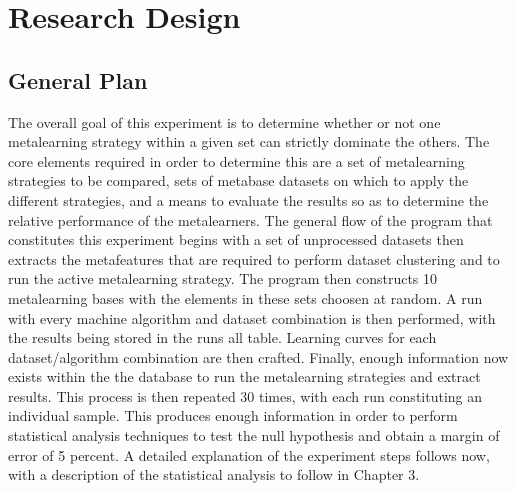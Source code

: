\chapter{Research Design}
\label{Chapter3}
\section{General Plan}
The overall goal of this experiment is to determine whether or not one
metalearning strategy within a given set can strictly dominate the others. The
core elements required in order to determine this are a set of metalearning
strategies to be compared, sets of metabase datasets on which to apply the
different strategies, and a means to evaluate the results so as to determine the
relative performance of the metalearners. The general flow of the program that
constitutes this experiment begins with a set of unprocessed datasets then
extracts the metafeatures that are required to perform dataset clustering and to
run the active metalearning strategy. The program then constructs 10
metalearning bases with the elements in these sets choosen at random. A run with
every machine algorithm and dataset combination is then performed, with the
results being stored in the runs all table. Learning curves for each
dataset/algorithm combination are then crafted. Finally, enough information now
exists within the the database to run the metalearning strategies
and extract results. This process is then repeated 30 times, with each run
constituting an individual sample. This produces enough information in order
to perform statistical analysis techniques to test the null hypothesis and
obtain a margin of error of 5 percent. A detailed explanation of the experiment
steps follows now, with a description of the statistical analysis to follow in
Chapter 3.

